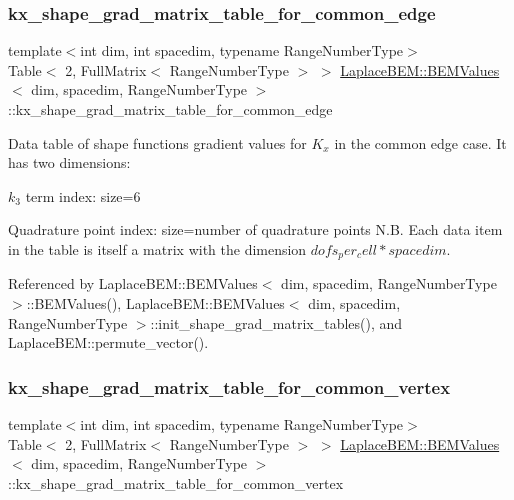 \subsubsection{\texorpdfstring{kx\+\_\+shape\+\_\+grad\+\_\+matrix\+\_\+table\+\_\+for\+\_\+common\+\_\+edge}{kx\_shape\_grad\_matrix\_table\_for\_common\_edge}}
{\footnotesize\ttfamily template$<$int dim, int spacedim, typename Range\+Number\+Type$>$ \\
Table$<$ 2, Full\+Matrix$<$ Range\+Number\+Type $>$ $>$ \hyperlink{classLaplaceBEM_1_1BEMValues}{Laplace\+B\+E\+M\+::\+B\+E\+M\+Values}$<$ dim, spacedim, Range\+Number\+Type $>$\+::kx\+\_\+shape\+\_\+grad\+\_\+matrix\+\_\+table\+\_\+for\+\_\+common\+\_\+edge}

Data table of shape function\textquotesingle{}s gradient values for $K_x$ in the common edge case. It has two dimensions\+:
\begin{DoxyEnumerate}
\item $k_3$ term index\+: size=6
\item Quadrature point index\+: size=number of quadrature points N.\+B. Each data item in the table is itself a matrix with the dimension $dofs_per_cell*spacedim$. 
\end{DoxyEnumerate}

Referenced by Laplace\+B\+E\+M\+::\+B\+E\+M\+Values$<$ dim, spacedim, Range\+Number\+Type $>$\+::\+B\+E\+M\+Values(), Laplace\+B\+E\+M\+::\+B\+E\+M\+Values$<$ dim, spacedim, Range\+Number\+Type $>$\+::init\+\_\+shape\+\_\+grad\+\_\+matrix\+\_\+tables(), and Laplace\+B\+E\+M\+::permute\+\_\+vector().

\mbox{\label{classLaplaceBEM_1_1BEMValues_ab899ed26e3876de83d8fe09d8579b1ee}} 
\subsubsection{\texorpdfstring{kx\+\_\+shape\+\_\+grad\+\_\+matrix\+\_\+table\+\_\+for\+\_\+common\+\_\+vertex}{kx\_shape\_grad\_matrix\_table\_for\_common\_vertex}}
{\footnotesize\ttfamily template$<$int dim, int spacedim, typename Range\+Number\+Type$>$ \\
Table$<$ 2, Full\+Matrix$<$ Range\+Number\+Type $>$ $>$ \hyperlink{classLaplaceBEM_1_1BEMValues}{Laplace\+B\+E\+M\+::\+B\+E\+M\+Values}$<$ dim, spacedim, Range\+Number\+Type $>$\+::kx\+\_\+shape\+\_\+grad\+\_\+matrix\+\_\+table\+\_\+for\+\_\+common\+\_\+vertex}

